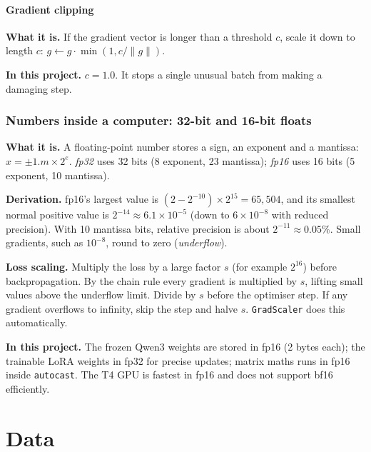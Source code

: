\documentclass[10pt,a4paper]{article}
\newcommand{\what}[1]{\par\textbf{What it is.} #1}
\newcommand{\here}[1]{\par\textbf{In this project.} #1}
\newcommand{\deriv}{\par\textbf{Derivation.} }
\begin{document}
\subsection{Gradient clipping}
\what{If the gradient vector is longer than a threshold $c$, scale it down to length $c$: $g\leftarrow g\cdot\min(1,c/\lVert g\rVert)$.}
\here{$c=1.0$. It stops a single unusual batch from making a damaging step.}

\section{Numbers inside a computer: 32-bit and 16-bit floats}\label{sec:fp16}
\what{A floating-point number stores a sign, an exponent and a mantissa: $x=\pm1.m\times2^{e}$. \emph{fp32} uses 32 bits (8 exponent, 23 mantissa); \emph{fp16} uses 16 bits (5 exponent, 10 mantissa).}
\deriv fp16's largest value is $(2-2^{-10})\times2^{15}=65{,}504$, and its smallest normal positive value is $2^{-14}\approx6.1\times10^{-5}$ (down to $6\times10^{-8}$ with reduced precision). With 10 mantissa bits, relative precision is about $2^{-11}\approx0.05\%$. Small gradients, such as $10^{-8}$, round to zero (\emph{underflow}).

\textbf{Loss scaling.} Multiply the loss by a large factor $s$ (for example $2^{16}$) before backpropagation. By the chain rule every gradient is multiplied by $s$, lifting small values above the underflow limit. Divide by $s$ before the optimiser step. If any gradient overflows to infinity, skip the step and halve $s$. \texttt{GradScaler} does this automatically.
\here{The frozen Qwen3 weights are stored in fp16 (2 bytes each); the trainable LoRA weights in fp32 for precise updates; matrix maths runs in fp16 inside \texttt{autocast}. The T4 GPU is fastest in fp16 and does not support bf16 efficiently.}

\part{Data}
\end{document}
